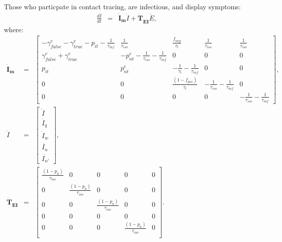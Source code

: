 \documentclass{article}
\begin{document}
Those who particpate in contact tracing, are infectious, and display symptoms:
\begin{eqnarray}
\frac{d\dot{I}}{dt} &=& \boldsymbol{\dot{I}_{m}}  \dot{I} + \boldsymbol{\dot{T}_{\dot{E}\dot{I}}}  \dot{E}, 
\end{eqnarray}
where:
%
\begin{eqnarray}
\boldsymbol{\dot{I}_{m}} &=&
\begin{bmatrix}
 -\gamma^{c}_{false} -\gamma^{c}_{true} - p_{it} -\frac{1}{\tau_{inf}} & \frac{1}{\tau_{iso}}  & \frac{f_{neg}}{\tau_{t}} & \frac{1}{\tau_{iso}} & \frac{1}{\tau_{iso}} \\
\gamma^{c}_{false} + \gamma^{c}_{true}    &  -p^{c}_{nt}  - \frac{1}{\tau_{iso}} - \frac{1}{\tau_{inf}}      &  0    & 0  & 0\\
p_{it}     &  p^{c}_{nt}                  &  -\frac{1}{\tau_{t}}  - \frac{1}{\tau_{inf}}  & 0 & 0\\
0 & 0 & \frac{(1-f_{pos})}{\tau_{t}}  & -\frac{1}{\tau_{iso}}  -  \frac{1}{\tau_{inf}} & 0 \\ 
0 & 0 & 0 & 0 & -\frac{1}{\tau_{iso}}  -  \frac{1}{\tau_{inf}}
\end{bmatrix}, \\ 
%
\dot{I} &=& 
\begin{bmatrix}
\dot{I} \\ \dot{I}_{q} \\ \dot{I}_{w}\\ \dot{I_{n}} \\ \dot{I_{n'}}
\end{bmatrix}, \\ 
%
\boldsymbol{\dot{T}_{\dot{E}\dot{I}}} &=&
\begin{bmatrix}
\frac{(1-p_{a})}{\tau_{inc}}  & 0                 & 0 & 0 & 0\\ 
 0          &  \frac{(1-p_{a})}{\tau_{inc}}  & 0 & 0 & 0 \\ 
 0          & 0                 &  \frac{(1-p_{a})}{\tau_{inc}} & 0 & 0 \\ 
0           & 0                 &  0 & 0 & 0 \\ 
0           & 0                 &  0 & \frac{(1-p_{a})}{\tau_{inc}} & 0 \\
\end{bmatrix}.
\end{eqnarray}
\end{document}
